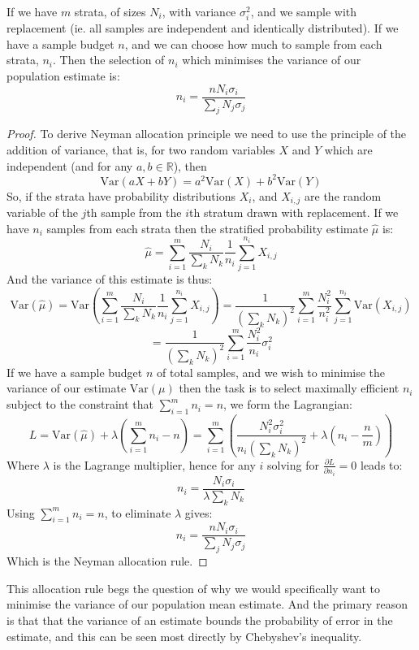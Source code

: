 \begin{theorem}
If we have $m$ strata, of sizes $N_i$, with variance $\sigma_i^2$, and we sample with replacement (ie. all samples are independent and identically distributed). If we have a sample budget $n$, and we can choose how much to sample from each strata, $n_i$.
Then the selection of $n_i$ which minimises the variance of our population estimate is:
$$n_i = \frac{nN_i\sigma_i}{\sum_jN_j\sigma_j}$$
\end{theorem}
\begin{proof}
To derive Neyman allocation principle we need to use the principle of the addition of variance, that is, for two random variables $X$ and $Y$ which are independent (and for any $a,b\in \mathbb{R}$), then $$\text{Var}(aX+bY) = a^2\text{Var}(X)+b^2\text{Var}(Y)$$
So, if the strata have probability distributions $X_i$, and $X_{i,j}$ are the random variable of the $j$th sample from the $i$th stratum drawn with replacement. If we have $n_i$ samples from each strata then the stratified probability estimate $\hat{\mu}$ is:
$$ \hat{\mu} = \sum_{i=1}^m\frac{N_i}{\sum_kN_k}\frac{1}{n_i}\sum_{j=1}^{n_i}X_{i,j} $$
And the variance of this estimate is thus:
$$ \text{Var}(\hat{\mu}) = \text{Var}\left(\sum_{i=1}^m\frac{N_i}{\sum_kN_k}\frac{1}{n_i}\sum_{j=1}^{n_i}X_{i,j}\right) = \frac{1}{\left(\sum_kN_k\right)^2}\sum_{i=1}^m\frac{N_i^2}{n_i^2}\sum_{j=1}^{n_i}\text{Var}(X_{i,j})$$
\begin{equation}\label{eq:variance_decomposition_for_strata_mean}= \frac{1}{\left(\sum_kN_k\right)^2} \sum_{i=1}^m\frac{N_i^2}{n_i}\sigma_i^2 \end{equation}
If we have a sample budget $n$ of total samples, and we wish to minimise the variance of our estimate $\text{Var}(\mu)$ then the task is to select maximally efficient $n_i$ subject to the constraint that $\sum_{i=1}^m n_i = n$, we form the Lagrangian:
$$L = \text{Var}(\hat{\mu}) + \lambda\left(\sum_{i=1}^mn_i-n\right) = \sum_{i=1}^m\left(\frac{N_i^2\sigma_i^2}{n_i\left(\sum_kN_k\right)^2} + \lambda \left(n_i-\frac{n}{m}\right)\right)$$
Where $\lambda$ is the Lagrange multiplier, hence for any $i$ solving for $\frac{\partial L}{\partial n_i}=0$ leads to:
$$n_i = \frac{N_i\sigma_i}{\lambda\sum_kN_k}$$
Using $\sum_{i=1}^m n_i = n$, to eliminate $\lambda$ gives:
$$n_i = \frac{nN_i\sigma_i}{\sum_jN_j\sigma_j}$$
Which is the Neyman allocation rule.
\end{proof}

This allocation rule begs the question of why we would specifically want to minimise the variance of our population mean estimate.
And the primary reason is that that the variance of an estimate bounds the probability of error in the estimate, and this can be seen most directly by Chebyshev's inequality.

